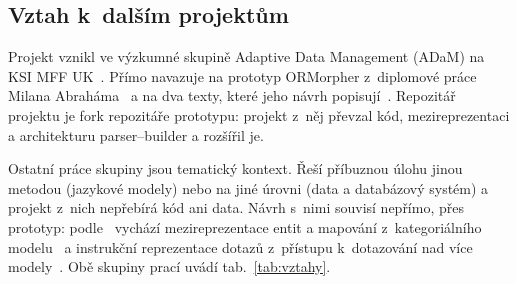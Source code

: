\subsection{Vztah k~dalším projektům}

Projekt vznikl ve výzkumné skupině Adaptive Data Management (ADaM) na KSI MFF UK~\cite{adam-web}. Přímo navazuje na prototyp ORMorpher z~diplomové práce Milana Abraháma~\cite{abraham-dp} a na dva texty, které jeho návrh popisují~\cite{ormorpher-ase,ormorpher-jss}. Repozitář projektu je fork repozitáře prototypu: projekt z~něj převzal kód, mezireprezentaci a architekturu parser--builder a rozšířil je.

Ostatní práce skupiny jsou tematický kontext. Řeší příbuznou úlohu jinou metodou (jazykové modely) nebo na jiné úrovni (data a databázový systém) a projekt z~nich nepřebírá kód ani data. Návrh s~nimi souvisí nepřímo, přes prototyp: podle~\cite{ormorpher-ase} vychází mezireprezentace entit a mapování z~kategoriálního modelu~\cite{koupil-holubova-2022} a instrukční reprezentace dotazů z~přístupu k~dotazování nad více modely~\cite{koupil-crha-holubova-2025}. Obě skupiny prací uvádí tab.~\ref{tab:vztahy}.

